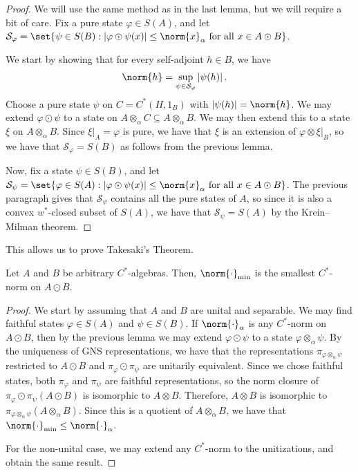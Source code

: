 \documentclass[10pt]{mypackage}
\begin{document}
\begin{proof}
  We will use the same method as in the last lemma, but we will require a bit of care. Fix a pure state $\varphi\in S(A)$, and let $\mathcal{S}_{\varphi} = \set{\psi\in S(B) : \left\vert \varphi\odot\psi(x) \right\vert\leq \norm{x}_{\alpha}\text{ for all }x\in A\odot B}$.

  We start by showing that for every self-adjoint $h\in B$, we have
  \begin{align*}
    \norm{h} &= \sup_{\psi\in \mathcal{S}_{\varphi}} \left\vert \psi(h) \right\vert.
  \end{align*}
  Choose a pure state $\psi$ on $C = C^{\ast}\left( H,1_B \right)$ with $\left\vert \psi(h) \right\vert = \norm{h}$. We may extend $\varphi\odot\psi$ to a state on $A\otimes_{\alpha}C\subseteq A\otimes_{\alpha}B$. We may then extend this to a state $\xi$ on $A\otimes_{\alpha}B$. Since $\xi|_{A} = \varphi$ is pure, we have that $\xi$ is an extension of $\varphi\otimes \xi|_{B}$, so we have that $\mathcal{S}_{\varphi} = S(B)$ as follows from the previous lemma.

  Now, fix a state $\psi\in S(B)$, and let $\mathcal{S}_{\psi} = \set{\varphi\in S(A) : \left\vert \varphi\odot\psi(x) \right\vert\leq \norm{x}_{\alpha}\text{ for all }x\in A\odot B}$. The previous paragraph gives that $\mathcal{S}_{\psi}$ contains all the pure states of $A$, so since it is also a convex $w^{\ast}$-closed subset of $S(A)$, we have that $\mathcal{S}_{\psi} = S(A)$ by the Krein--Milman theorem.
\end{proof}
This allows us to prove Takesaki's Theorem.
\begin{theorem}
  Let $A$ and $B$ be arbitrary $C^{\ast}$-algebras. Then, $\norm{\cdot}_{\min}$ is the smallest $C^{\ast}$-norm on $A\odot B$.
\end{theorem}
\begin{proof}
  We start by assuming that $A$ and $B$ are unital and separable. We may find faithful states $\varphi\in S(A)$ and $\psi\in S(B)$. If $\norm{\cdot}_{\alpha}$ is any $C^{\ast}$-norm on $A\odot B$, then by the previous lemma we may extend $\varphi\odot\psi$ to a state $\varphi\otimes_{\alpha}\psi$. By the uniqueness of GNS representations, we have that the representations $\pi_{\varphi\otimes_{\alpha}\psi}$ restricted to $A\odot B$ and $\pi_{\varphi}\odot\pi_{\psi}$ are unitarily equivalent. Since we chose faithful states, both $\pi_{\varphi}$ and $\pi_{\psi}$ are faithful representations, so the norm closure of $\pi_{\varphi}\odot\pi_{\psi}\left( A\odot B \right)$ is isomorphic to $A\otimes B$. Therefore, $A\otimes B$ is isomorphic to $\pi_{\varphi\otimes_{\alpha}\psi}\left( A\otimes_{\alpha}B \right)$. Since this is a quotient of $A\otimes_{\alpha}B$, we have that $\norm{\cdot}_{\min}\leq \norm{\cdot}_{\alpha}$.

  For the non-unital case, we may extend any $C^{\ast}$-norm to the unitizations, and obtain the same result.
\end{proof}
\end{document}
